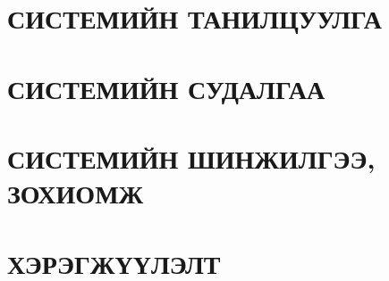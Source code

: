 \chapter{СИСТЕМИЙН ТАНИЛЦУУЛГА}


\chapter{СИСТЕМИЙН СУДАЛГАА}


\chapter{СИСТЕМИЙН ШИНЖИЛГЭЭ, ЗОХИОМЖ}


\chapter{ХЭРЭГЖҮҮЛЭЛТ}



